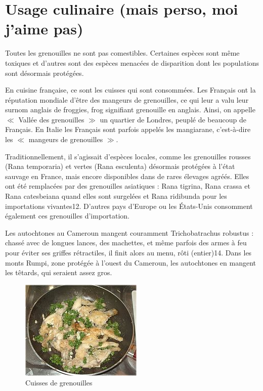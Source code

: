 \section{Usage culinaire (mais perso, moi j'aime pas)}

Toutes les grenouilles ne sont pas comestibles. Certaines espèces sont même toxiques et d'autres sont des espèces menacées de disparition dont les populations sont désormais protégées.

En cuisine française, ce sont les cuisses qui sont consommées. Les Français ont la réputation mondiale d'être des mangeurs de grenouilles, ce qui leur a valu leur surnom anglais de froggies, frog signifiant grenouille en anglais. Ainsi, on appelle $\ll$ Vallée des grenouilles $\gg$ un quartier de Londres, peuplé de beaucoup de Français.
En Italie les Français sont parfois appelés les mangiarane, c'est-à-dire les $\ll$ mangeurs de grenouilles $\gg$.

Traditionnellement, il s'agissait d'espèces locales, comme les grenouilles rousses (Rana temporaria) et vertes (Rana esculenta) désormais protégées à l'état sauvage en France, mais encore disponibles dans de rares élevages agréés. Elles ont été remplacées par des grenouilles asiatiques : Rana tigrina, Rana crassa et Rana catesbeiana quand elles sont surgelées et Rana ridibunda pour les importations vivantes12. D'autres pays d'Europe ou les États-Unis consomment également ces grenouilles d'importation.

Les autochtones au Cameroun mangent couramment Trichobatrachus robustus : chassé avec de longues lances, des machettes, et même parfois des armes à feu pour éviter ses griffes rétractiles, il finit alors au menu, rôti (entier)14. Dans les monts Rumpi, zone protégée à l'ouest du Cameroun, les autochtones en mangent les têtards, qui seraient assez gros.

\begin{figure}
	\begin{center}
		\includegraphics[scale=1]{cuisine/miam.JPG}
			\caption{Cuisses de grenouilles}
			\label{fig:gre}
	\end{center}
\end{figure}